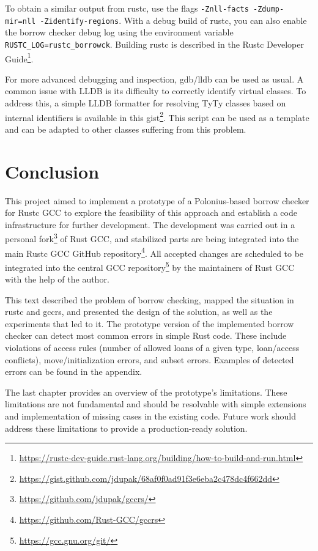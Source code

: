 \documentclass[
  11pt,
  twoside]{report}
\DeclareRobustCommand{\href}[2]{#2\footnote{\url{#1}}}
\begin{document}
To obtain a similar output from rustc, use the flags
\texttt{-Znll-facts\ -Zdump-mir=nll\ -Zidentify-regions}. With a debug
build of rustc, you can also enable the borrow checker debug log using
the environment variable \texttt{RUSTC\_LOG=rustc\_borrowck}. Building
rustc is described in the
\href{https://rustc-dev-guide.rust-lang.org/building/how-to-build-and-run.html}{Rustc
Developer Guide}.

For more advanced debugging and inspection, gdb/lldb can be used as
usual. A common issue with LLDB is its difficulty to correctly identify
virtual classes. To address this, a simple LLDB formatter for resolving
TyTy classes based on internal identifiers is available in
\href{https://gist.github.com/jdupak/68af0f0ad91f3e6eba2c478dc4f662dd}{this
gist}. This script can be used as a template and can be adapted to other
classes suffering from this problem.

\chapter{Conclusion}\label{sec:conclusion}

This project aimed to implement a prototype of a Polonius-based borrow
checker for Rustc GCC to explore the feasibility of this approach and
establish a code infrastructure for further development. The development
was carried out in a \href{https://github.com/jdupak/gccrs/}{personal
fork} of Rust GCC, and stabilized parts are being integrated into the
main \href{https://github.com/Rust-GCC/gccrs}{Rustc GCC GitHub
repository}. All accepted changes are scheduled to be integrated into
the \href{https://gcc.gnu.org/git/}{central GCC repository} by the
maintainers of Rust GCC with the help of the author.

This text described the problem of borrow checking, mapped the situation
in rustc and gccrs, and presented the design of the solution, as well as
the experiments that led to it. The prototype version of the implemented
borrow checker can detect most common errors in simple Rust code. These
include violations of access rules (number of allowed loans of a given
type, loan/access conflicts), move/initialization errors, and subset
errors. Examples of detected errors can be found in the appendix.

The last chapter provides an overview of the prototype's limitations.
These limitations are not fundamental and should be resolvable with
simple extensions and implementation of missing cases in the existing
code. Future work should address these limitations to provide a
production-ready solution.
\end{document}
